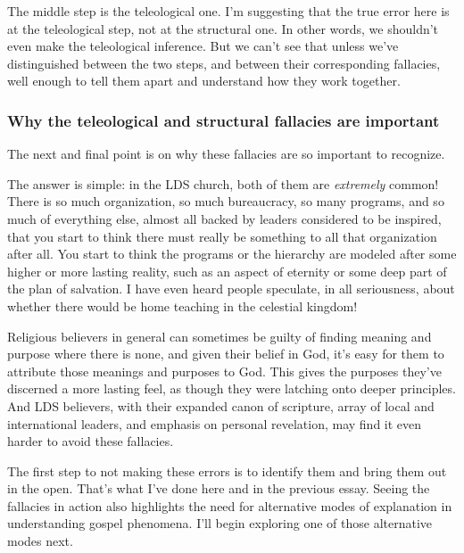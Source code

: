 		The middle step is the teleological one.
		I'm suggesting that the true error here is at the teleological step,
			not at the structural one.
		In other words,
			we shouldn't even make the teleological inference.
		But we can't see that unless we've distinguished between the two steps,
			and between their corresponding fallacies,
				well enough to tell them apart and understand how they work together.
		
	\subsubsection{Why the teleological and structural fallacies are important}
	
		The next and final point is on why these fallacies are so important to recognize.
		
		The answer is simple:
			in the LDS church,
				both of them are \textit{extremely} common!
		There is so much organization,
			so much bureaucracy,
				so many programs,
					and so much of everything else,
						almost all backed by leaders considered to be inspired,
							that you start to think there must really be something to all that organization after all.
		You start to think the programs or the hierarchy are modeled after some higher or more lasting reality,
			such as an aspect of eternity or some deep part of the plan of salvation.
		I have even heard people speculate,
			in all seriousness,
				about whether there would be home teaching in the celestial kingdom!
				
		Religious believers in general can sometimes be guilty of finding meaning and purpose where there is none,
			and given their belief in God,
				it's easy for them to attribute those meanings and purposes to God.
		This gives the purposes they've discerned a more lasting feel,
			as though they were latching onto deeper principles.
		And LDS believers,
			with their expanded canon of scripture,
				array of local and international leaders,
					and emphasis on personal revelation,
						may find it even harder to avoid these fallacies.
		
		The first step to not making these errors is to identify them and bring them out in the open.
		That's what I've done here and in the previous essay.
		Seeing the fallacies in action also highlights the need for alternative modes of explanation in understanding gospel phenomena.
		I'll begin exploring one of those alternative modes next.